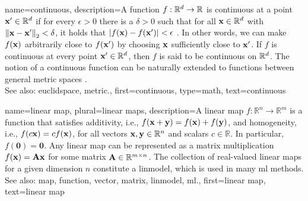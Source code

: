 {name={continuous}, 
description={A \gls{function} $f: \mathbb{R}^{d} \to \mathbb{R}$ is 
	 continuous at a point ${\bf x}' \in \mathbb{R}^{d}$ if for 
	 every $\epsilon > 0$ there is a $\delta > 0$ such that for all 
	 ${\bf x} \in \mathbb{R}^{d}$ with $\left\Vert {{\bf x}- {\bf x}'} \right\Vert_{2} < \delta$, 
	 it holds that $|f({\bf x}) - f({\bf x}')| < \epsilon$ \cite{RudinBookPrinciplesMatheAnalysis}. 
	 In other words, we can make $f({\bf x})$ arbitrarily close to $f({\bf x}')$ 
	 by choosing ${\bf x}$ sufficiently close to ${\bf x}'$. If $f$ is continuous 
	 at every point ${\bf x}' \in \mathbb{R}^{d}$, then $f$ is said to be 
	 continuous on $\mathbb{R}^{d}$. The notion of a continuous 
	 \gls{function} can be naturally extended to \glspl{function} between general \gls{metric} 
	 spaces \cite{RudinBookPrinciplesMatheAnalysis}.\\
		See also: \gls{euclidspace}, \gls{metric}.},
	first={continuous},
	type=math,
	text={continuous}
}

{name={linear map}, plural={linear maps}, 
	description={A linear \gls{map} $f: \mathbb{R}^n \rightarrow \mathbb{R}^m$ is a \gls{function} that satisfies additivity, i.e.,
		$f({\bf x} + {\bf y}) = f({\bf x}) + f({\bf y})$, and homogeneity, i.e.,
		$f(c{\bf x}) = c f({\bf x})$, for all \glspl{vector} ${\bf x}, {\bf y} \in \mathbb{R}^n$ and scalars $c \in \mathbb{R}$. 
		In particular, $f(\mathbf{0}) = \mathbf{0}$. Any linear \gls{map} can be represented as a \gls{matrix} 
		multiplication $f({\bf x}) = {\bf A} {\bf x}$ for some \gls{matrix} ${\bf A} \in \mathbb{R}^{m \times n}$. 
		The collection of real-valued linear \glspl{map} for a given dimension $n$ constitute a \gls{linmodel}, 
		which is used in many \gls{ml} methods.
		\\
		See also: \gls{map}, \gls{function}, \gls{vector}, \gls{matrix}, \gls{linmodel}, \gls{ml}.},
	first={linear map},
	text={linear map}
}

